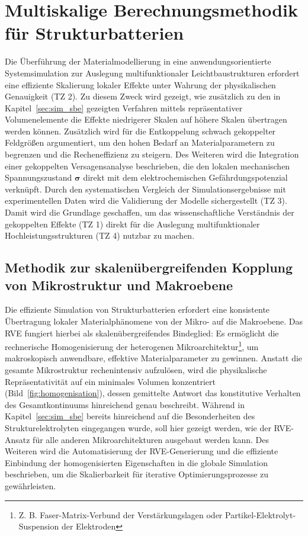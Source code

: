 \chapter{Multiskalige Berechnungsmethodik für Strukturbatterien}\label{sec:multi_scale}

Die Überführung der Materialmodellierung in eine anwendungsorientierte Systemsimulation zur Auslegung multifunktionaler Leichtbaustrukturen erfordert eine effiziente Skalierung lokaler Effekte unter Wahrung der physikalischen Genauigkeit (TZ 2). Zu diesem Zweck wird gezeigt, wie zusätzlich zu den in Kapitel~\ref{sec:sim_sbe} gezeigten Verfahren mittels repräsentativer Volumenelemente die Effekte niedrigerer Skalen auf höhere Skalen übertragen werden können. Zusätzlich wird für die Entkoppelung schwach gekoppelter Feldgrößen argumentiert, um den hohen Bedarf an Materialparametern zu begrenzen und die Recheneffizienz zu steigern. Des Weiteren wird die Integration einer gekoppelten Versagensanalyse beschrieben, die den lokalen mechanischen Spannungszustand $\boldsymbol{\sigma}$ direkt mit dem elektrochemischen Gefährdungspotenzial verknüpft. Durch den systematischen Vergleich der Simulationsergebnisse mit experimentellen Daten wird die Validierung der Modelle sichergestellt (TZ 3). Damit wird die Grundlage geschaffen, um das wissenschaftliche Verständnis der gekoppelten Effekte (TZ 1) direkt für die Auslegung multifunktionaler Hochleistungsstrukturen (TZ 4) nutzbar zu machen.

\section{Methodik zur skalenübergreifenden Kopplung von Mikrostruktur und Makroebene}\label{sec:rve_methodology}

Die effiziente Simulation von Strukturbatterien erfordert eine konsistente Übertragung lokaler Materialphänomene von der Mikro- auf die Makroebene. Das RVE fungiert hierbei als skalenübergreifendes Bindeglied: Es ermöglicht die rechnerische Homogenisierung der heterogenen Mikroarchitektur\footnote{Z. B. Faser-Matrix-Verbund der Verstärkungslagen oder Partikel-Elektrolyt-Suspension der Elektroden}, um makroskopisch anwendbare, effektive Materialparameter zu gewinnen. Anstatt die gesamte Mikrostruktur rechenintensiv aufzulösen, wird die physikalische Repräsentativität auf ein minimales Volumen konzentriert (Bild~\ref{fig:homogenisation}), dessen gemittelte Antwort das konstitutive Verhalten des Gesamtkontinuums hinreichend genau beschreibt. Während in Kapitel~\ref{sec:sim_sbe} bereits hinreichend auf die Besonderheiten des Strukturelektrolyten eingegangen wurde, soll hier gezeigt werden, wie der RVE-Ansatz für alle anderen Mikroarchitekturen ausgebaut werden kann. Des Weiteren wird die Automatisierung der RVE-Generierung und die effiziente Einbindung der homogenisierten Eigenschaften in die globale Simulation beschrieben, um die Skalierbarkeit für iterative Optimierungsprozesse zu gewährleisten.

